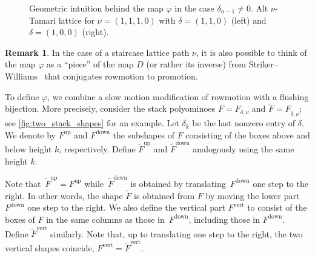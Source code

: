 \documentclass[11pt]{amsart}
\newcounter{height}
\newcommand{\up}{^{\operatorname{up}}}
\newcommand{\down}{^{\operatorname{down}}}
\newcommand{\ver}{^{\operatorname{vert}}}
\theoremstyle{definition}
\newtheorem{remark}[theorem]{Remark}
\begin{document}
\begin{figure}[ht]
\begin{center}
{\begin{tikzpicture}
\end{tikzpicture}
}
\end{center}
\caption{Geometric intuition behind the map $\varphi$ in the case $\delta_{n-1} \neq 0$. Alt $\nu$-Tamari lattice for $\nu=(1,1,1,0)$ with $\delta=(1,1,0)$ (left) and $\delta=(1,0,0)$ (right).}
\label{fig:tropical_varphi2}
\end{figure}

\begin{remark}
In the case of a staircase lattice path $\nu$, it is also possible to think of the map $\varphi$ as a ``piece'' of the map $D$ (or rather its inverse) from Striker--Williams~\cite[Theorem 5.4]{striker2012rowmotion} that conjugates rowmotion to promotion.
\end{remark}

To define $\varphi$, we combine a slow motion modification of rowmotion with a flushing bijection. More precisely, consider the stack polyominoes $F=F_{\delta,\nu}$ and $\widetilde F = F_{\widetilde \delta,\nu}$; see \cref{fig:two_stack_shapes} for an example. Let $\delta_k$ be the last nonzero entry of $\delta$. We denote by $F\up$ and $F\down$ the subshapes of $F$ consisting of the boxes above and below height $k$, respectively. Define $\widetilde F\up$ and $\widetilde F\down$ analogously using the same height $k$.

Note that~$\widetilde F\up=F\up$ while~$\widetilde F\down$ is obtained by translating~$F\down$ one step to the right. In other words, the shape $\widetilde F$ is obtained from $F$ by moving the lower part $F\down$ one step to the right.  We also define the vertical part $F\ver$ to consist of the boxes of $F$ in the same columns as those in~$F\down$, including those in $F\down$. Define $\widetilde F\ver$ similarly. Note that, up to translating one step to the right, the two vertical shapes coincide, $F\ver = \widetilde F\ver$.
\end{document}
